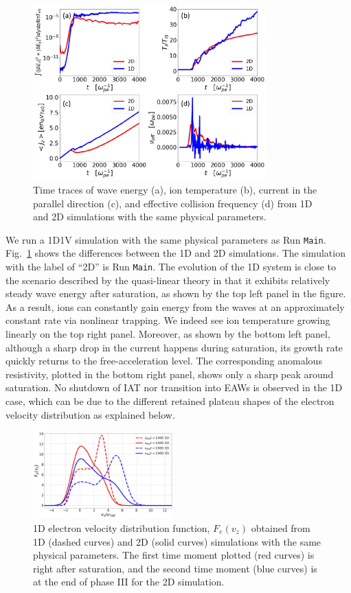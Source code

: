 \documentclass[%
 reprint,
 amsmath,
 amssymb,
 aps,
 prx,
floatfix,
superscriptaddress
]{revtex4-2}
\begin{document}
\begin{figure}[!htbp]
  \includegraphics[width=0.8\textwidth]{Fig_app_1.pdf}
\caption{Time traces of wave energy (a), ion temperature (b), current in the parallel direction (c), and effective collision frequency (d) from 1D and 2D simulations with the same physical parameters.}
\label{sup:fig:1D}
\end{figure}


We run a 1D1V simulation with the same physical parameters as Run {\tt Main}. 
Fig.~\ref{sup:fig:1D} shows the differences between the 1D and 2D simulations. The simulation with the label of ``2D'' is Run {\tt Main}.
The evolution of the 1D system is close to the scenario described by the quasi-linear theory in that it exhibits relatively steady wave energy after saturation, as shown by the top left panel in the figure.
As a result, ions can constantly gain energy from the waves at an approximately constant rate via nonlinear trapping. We indeed see ion temperature growing linearly on the top right panel.
Moreover, as shown by the bottom left panel, although a sharp drop in the current happens during saturation, its growth rate quickly returns to the free-acceleration level. 
The corresponding anomalous resistivity, plotted in the bottom right panel, shows only a sharp peak around saturation. 
No shutdown of IAT nor transition into EAWs is observed in the 1D case,  which can be due to the different retained plateau shapes of the electron velocity distribution as explained below.

\begin{figure}[!htbp]
  \includegraphics[width=0.48\textwidth]{Fig_app_2.jpg}
\caption{1D electron velocity distribution function, $F_e(v_z)$ obtained from 1D (dashed curves) and 2D (solid curves) simulations with the same physical parameters. The first time moment plotted (red curves) is right after saturation, and the second time moment (blue curves) is at the end of phase III for the 2D simulation.}
\label{sup:fig:1D_dist}
\end{figure}
\end{document}
